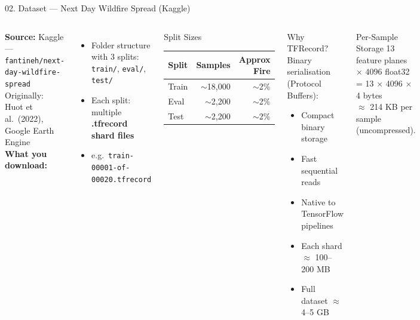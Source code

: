 ﻿\documentclass[aspectratio=169,t]{beamer}
\begin{document}
\begin{frame}{02. Dataset --- Next Day Wildfire Spread (Kaggle)}
\begin{columns}[t]
\textcolor{accent}{\textbf{Source:}} Kaggle --- \texttt{\footnotesize fantineh/next-day-wildfire-spread}\\[0.2cm]
\textcolor{textsecondary}{\small Originally: Huot et al.\ (2022), Google Earth Engine}\\[0.3cm]
\textcolor{accentgreen}{\textbf{What you download:}}
\begin{itemize}
  \item Folder structure with 3 splits: \texttt{train/}, \texttt{eval/}, \texttt{test/}
  \item Each split: multiple \textbf{.tfrecord shard files}
  \item e.g.\ \texttt{train-00001-of-00020.tfrecord}
\end{itemize}
\vspace{0.2cm}
\begin{block}{Split Sizes}
\small
\begin{tabular}{lrr}
\toprule
\textcolor{accent}{Split} & \textcolor{accent}{Samples} & \textcolor{accent}{Approx Fire} \\
\midrule
Train & $\sim$18,000 & $\sim$2\% \\
Eval  & $\sim$2,200  & $\sim$2\% \\
Test  & $\sim$2,200  & $\sim$2\% \\
\bottomrule
\end{tabular}
\end{block}
\begin{alertblock}{Why TFRecord?}
\small
Binary serialisation (Protocol Buffers):\\
\begin{itemize}
  \item Compact binary storage
  \item Fast sequential reads
  \item Native to TensorFlow pipelines
  \item Each shard $\approx$ 100--200 MB
  \item Full dataset $\approx$ 4--5 GB
\end{itemize}
\end{alertblock}
\vspace{0.2cm}
\begin{exampleblock}{Per-Sample Storage}
\small
13 feature planes $\times$ $4096$ float32\\
= 13 $\times$ 4096 $\times$ 4 bytes\\
$\approx$ 214 KB per sample (uncompressed).
\end{exampleblock}
\end{columns}
\end{frame}
\end{document}
